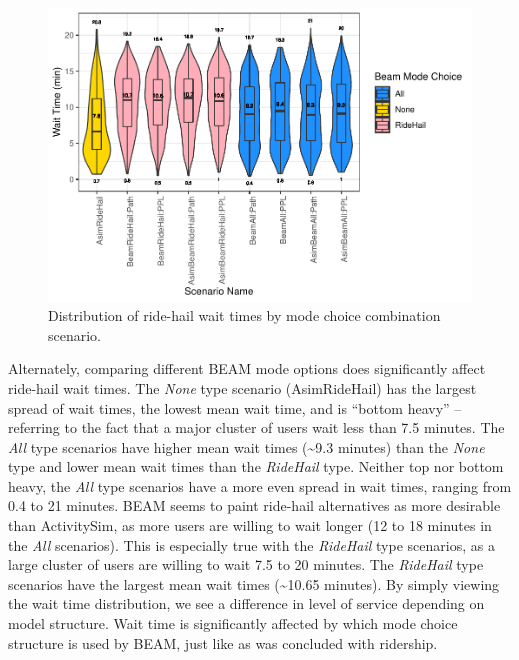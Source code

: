 \documentclass[simple, masters, twoside]{byuthesis}
\begin{document}
\begin{figure}

{\centering \includegraphics{thesis_files/figure-latex/waits-1} 

}

\caption[Distribution of ride-hail wait times.]{Distribution of ride-hail wait times by mode choice combination scenario.}\label{fig:waits}
\end{figure}

Alternately, comparing different BEAM mode options does significantly affect ride-hail wait times. The \emph{None} type scenario (AsimRideHail) has the largest spread of wait times, the lowest mean wait time, and is ``bottom heavy'' -- referring to the fact that a major cluster of users wait less than 7.5 minutes. The \emph{All} type scenarios have higher mean wait times (\textasciitilde9.3 minutes) than the \emph{None} type and lower mean wait times than the \emph{RideHail} type. Neither top nor bottom heavy, the \emph{All} type scenarios have a more even spread in wait times, ranging from 0.4 to 21 minutes. BEAM seems to paint ride-hail alternatives as more desirable than ActivitySim, as more users are willing to wait longer (12 to 18 minutes in the \emph{All} scenarios). This is especially true with the \emph{RideHail} type scenarios, as a large cluster of users are willing to wait 7.5 to 20 minutes. The \emph{RideHail} type scenarios have the largest mean wait times (\textasciitilde10.65 minutes). By simply viewing the wait time distribution, we see a difference in level of service depending on model structure. Wait time is significantly affected by which mode choice structure is used by BEAM, just like as was concluded with ridership.
\end{document}
